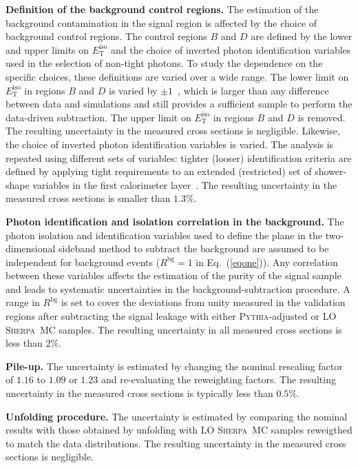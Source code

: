 \documentclass[cernpreprint,texlive=2016,txfonts,UKenglish]{latex/atlasdoc}
\def\rbg{R^{\mathrm{bg}}}
\def\etiso{E_{\mathrm{T}}^{\mathrm{iso}}}
\def\sher{{\textsc{Sherpa}}}
\def\pyt{{\textsc{Pythia}}}
\begin{document}
{\textbf{Definition of the background control regions.}}
The estimation of the background contamination in the signal region is
affected by the choice of background control regions. The control
regions $B$ and $D$ are defined by the lower and upper limits on
$\etiso$ and the choice of inverted photon identification variables
used in the selection of non-tight photons. To study the dependence on
the specific choices, these definitions are varied over a wide
range. The lower limit on $\etiso$ in regions $B$ and $D$ is varied by
$\pm 1$~\GeV, which is larger than any difference between data and
simulations and still provides a sufficient sample to perform the
data-driven subtraction. The upper limit on $\etiso$ in regions $B$
and $D$ is removed. The resulting uncertainty in the measured cross
sections is negligible. Likewise, the choice of inverted photon
identification variables is varied. The analysis is repeated using
different sets of variables: tighter (looser) identification criteria
are defined by applying tight requirements to an extended (restricted)
set of shower-shape variables in the first calorimeter
layer~\cite{epj:c76:666,ATL-PHYS-PUB-2016-014}. The resulting
uncertainty in the measured cross sections is smaller than $1.3\%$.

{\textbf{Photon identification and isolation correlation in the
    background.}}
The photon isolation and identification variables used to define the
plane in the two-dimensional sideband method to subtract the
background are assumed to be independent for background events
($\rbg=1$ in Eq.~(\ref{eqone})). Any correlation between these
variables affects the estimation of the purity of the signal sample
and leads to systematic uncertainties in the background-subtraction
procedure. A range in $\rbg$ is set to cover the deviations from unity
measured in the validation regions after subtracting the signal
leakage with either \pyt-adjusted or LO \sher\ MC samples. The
resulting uncertainty in all measured cross sections is less than
$2\%$.

{\textbf{Pile-up.}}
The uncertainty is estimated by changing the nominal rescaling factor
of $1.16$ to $1.09$ or $1.23$ and re-evaluating the reweighting
factors. The resulting uncertainty in the measured cross sections is
typically less than $0.5\%$.

{\textbf{Unfolding procedure.}}
The uncertainty is estimated by comparing the nominal results with
those obtained by unfolding with LO \sher\ MC samples reweigthed to
match the data distributions. The resulting uncertainty in the
measured cross sections is negligible.
\end{document}
